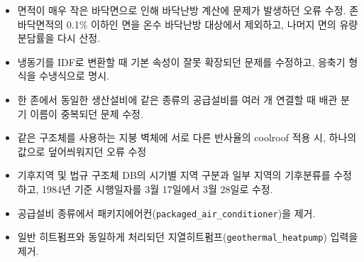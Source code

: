 {\begin{itemize}
        \item 면적이 매우 작은 바닥면으로 인해 바닥난방 계산에 문제가 발생하던 오류 수정. 존 바닥면적의 0.1\% 이하인 면을 온수 바닥난방 대상에서 제외하고, 나머지 면의 유량분담률을 다시 산정.
        \item 냉동기를 IDF로 변환할 때 기본 속성이 잘못 확장되던 문제를 수정하고, 응축기 형식을 수냉식으로 명시.
        \item 한 존에서 동일한 생산설비에 같은 종류의 공급설비를 여러 개 연결할 때 배관 분기 이름이 중복되던 문제 수정.
        \item 같은 구조체를 사용하는 지붕 벽체에 서로 다른 반사율의 coolroof 적용 시, 하나의 값으로 덮어씌워지던 오류 수정
        \item 기후지역 및 법규 구조체 DB의 시기별 지역 구분과 일부 지역의 기후분류를 수정하고, 1984년 기준 시행일자를 3월 17일에서 3월 28일로 수정.
    \end{itemize}
}{
    \begin{itemize}
        \item 공급설비 종류에서 패키지에어컨(\texttt{packaged\_air\_conditioner})을 제거.
        \item 일반 히트펌프와 동일하게 처리되던 지열히트펌프(\texttt{geothermal\_heatpump}) 입력을 제거.
    \end{itemize}
}



